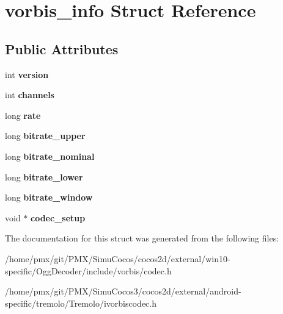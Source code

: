\hypertarget{structvorbis__info}{}\section{vorbis\+\_\+info Struct Reference}
\label{structvorbis__info}
\subsection*{Public Attributes}
\begin{DoxyCompactItemize}
\item 
\mbox{\label{structvorbis__info_a2d832259b1e3fbf4d1cd619ab5743612}} 
int {\bfseries version}
\item 
\mbox{\label{structvorbis__info_a4240e042b91744b4fd810426f18252b4}} 
int {\bfseries channels}
\item 
\mbox{\label{structvorbis__info_a01879ed23ecd9605cf6779ef2663a681}} 
long {\bfseries rate}
\item 
\mbox{\label{structvorbis__info_a2d9d0e0725ae71c855ad39ce07bf7c88}} 
long {\bfseries bitrate\+\_\+upper}
\item 
\mbox{\label{structvorbis__info_a71127d3e35c30fa110d7f321302a91b8}} 
long {\bfseries bitrate\+\_\+nominal}
\item 
\mbox{\label{structvorbis__info_a216284288febd46a5547901cd5e6cd62}} 
long {\bfseries bitrate\+\_\+lower}
\item 
\mbox{\label{structvorbis__info_aa511ecfc9eee8129df8f70e62ed08dc7}} 
long {\bfseries bitrate\+\_\+window}
\item 
\mbox{\label{structvorbis__info_ac9ee586dbc0bf3dec8ebee0a0daaa4a8}} 
void $\ast$ {\bfseries codec\+\_\+setup}
\end{DoxyCompactItemize}


The documentation for this struct was generated from the following files\+:\begin{DoxyCompactItemize}
\item 
/home/pmx/git/\+P\+M\+X/\+Simu\+Cocos/cocos2d/external/win10-\/specific/\+Ogg\+Decoder/include/vorbis/codec.\+h\item 
/home/pmx/git/\+P\+M\+X/\+Simu\+Cocos3/cocos2d/external/android-\/specific/tremolo/\+Tremolo/ivorbiscodec.\+h\end{DoxyCompactItemize}
